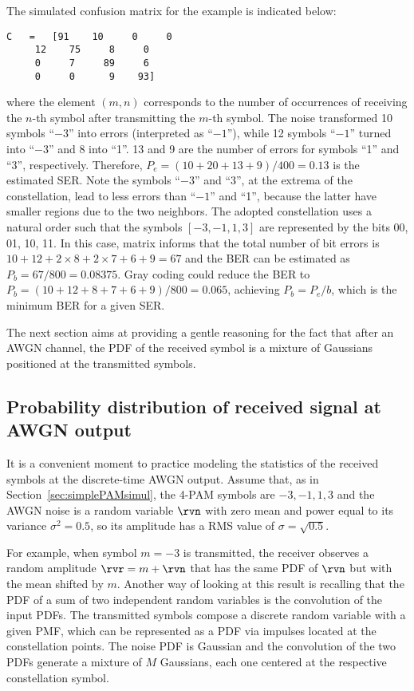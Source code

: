 The simulated confusion matrix  for the example is indicated below:
\begin{verbatim}
C	=	[91    10     0     0
     12    75     8     0
     0     7     89     6
     0     0      9    93]
\end{verbatim}
where the element $(m,n)$ corresponds to the number of occurrences of receiving the $n$-th symbol after transmitting the $m$-th symbol.
The noise transformed 10 symbols ``$-3$'' into errors (interpreted as ``$-1$''), while 12 symbols ``$-1$'' turned into ``$-3$'' and 8 into ``1''. 13 and 9 are the number of errors for symbols ``1'' and ``3'', respectively. Therefore, $P_e = (10+    20    +13+     9)/400 = 0.13$ is the estimated SER. Note the symbols ``$-3$'' and ``3'', at the extrema of the constellation, lead to less errors than ``$-1$'' and ``1'', because the latter have smaller regions due to the two neighbors. The adopted constellation uses a natural order such that the symbols $[-3,-1,1,3]$ are represented by the bits 00, 01, 10, 11. In this case, matrix  informs that the total number of bit errors is $10+12+2\times8+2\times7+6+9=67$ and the BER can be estimated as $P_b=67/800=0.08375$. Gray coding could reduce the BER to $P_b=(10+12+8+7+6+9)/800=0.065$, achieving $P_b = P_e/b$,
which is the minimum BER for a given SER.

The next section aims at providing a gentle reasoning for the fact that after an AWGN channel, the PDF of the received symbol is a mixture of Gaussians positioned at the transmitted symbols.

\subsection{Probability distribution of received signal at AWGN output}

It is a convenient moment to practice modeling the statistics of the received symbols at the discrete-time AWGN output.
Assume that, as in 
Section~\ref{sec:simplePAMsimul}, the 4-PAM symbols are $-3,-1,1,3$ and 
the AWGN noise is a random variable $\rvn$ with zero mean and power equal to its variance $\sigma^2 = 0.5$, so its amplitude has a RMS value of $\sigma = \sqrt{0.5}$.

For example, when symbol $m=-3$ is transmitted, the receiver observes a random amplitude $\rvr=m+\rvn$ that has the same PDF of $\rvn$ but with the mean shifted by $m$. Another way of looking at this result is recalling that the PDF of a sum of two independent random variables is the convolution of the input PDFs. The transmitted symbols compose a discrete random variable with a given PMF, which can be represented as a PDF via impulses located at the constellation points. The noise PDF is Gaussian and the convolution of the two PDFs generate a mixture of $M$ Gaussians, each one centered at the respective constellation symbol.

